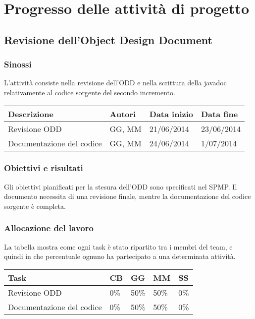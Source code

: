 \chapter{Progresso delle attività di progetto}
\section{Revisione dell'Object Design Document}
\subsection{Sinossi}
L'attività consiste nella revisione dell'ODD e nella scrittura della javadoc relativamente al codice sorgente del secondo incremento.

\begin{table}[ht]
 \begin{tabular}{|p{6cm}|p{2cm}|p{2cm}|p{2cm}|}
    \hline
    \rowcolor{Gray}\textbf{Descrizione}			& \textbf{Autori}		& \textbf{Data inizio}			& \textbf{Data fine}	\\
    \hline
    Revisione ODD					& GG, MM			& 21/06/2014				& 23/06/2014		\\
    \hline
    Documentazione del codice				& GG, MM			& 24/06/2014				& 1/07/2014		\\
    \hline
 \end{tabular}
\end{table}

\subsection{Obiettivi e risultati}
Gli obiettivi pianificati per la stesura dell'ODD sono specificati nel SPMP. Il documento necessita di una revisione finale, mentre la documentazione del codice sorgente è completa.

\subsection{Allocazione del lavoro}
La tabella mostra come ogni task è stato ripartito tra i membri del team, e quindi in che percentuale ognuno ha partecipato a una determinata attività.
\begin{table}[ht]
 \begin{tabular}{|p{7.5cm}|p{1cm}|p{1cm}|p{1cm}|p{1cm}|}
  \hline
  \rowcolor{Gray}\textbf{Task}			& \textbf{CB}		& \textbf{GG}		& \textbf{MM}		& \textbf{SS}		\\
  \hline
  Revisione ODD					& 0\%			& 50\%			& 50\%			& 0\%			\\
  \hline
  Documentazione del codice			& 0\%			& 50\%			& 50\%			& 0\%			\\
  \hline
 \end{tabular}
\end{table}

